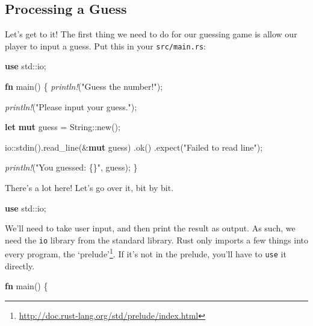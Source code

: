\documentclass[a4paper,]{book}
\newenvironment{Shaded}{\begin{snugshade}}{\end{snugshade}}
\newcommand{\KeywordTok}[1]{\textcolor[rgb]{0.13,0.29,0.53}{\textbf{{#1}}}}
\newcommand{\DataTypeTok}[1]{\textcolor[rgb]{0.13,0.29,0.53}{{#1}}}
\newcommand{\StringTok}[1]{\textcolor[rgb]{0.31,0.60,0.02}{{#1}}}
\newcommand{\PreprocessorTok}[1]{\textcolor[rgb]{0.56,0.35,0.01}{\textit{{#1}}}}
\newcommand{\NormalTok}[1]{{#1}}
\renewcommand{\href}[2]{#2\footnote{\url{#1}}}
\begin{document}
\subsection{Processing a Guess}\label{processing-a-guess}

Let's get to it! The first thing we need to do for our guessing game is
allow our player to input a guess. Put this in your
\texttt{src/main.rs}:

\begin{Shaded}
\begin{Highlighting}[]
\KeywordTok{use} \NormalTok{std::io;}

\KeywordTok{fn} \NormalTok{main() \{}
    \PreprocessorTok{println!}\NormalTok{(}\StringTok{"Guess the number!"}\NormalTok{);}

    \PreprocessorTok{println!}\NormalTok{(}\StringTok{"Please input your guess."}\NormalTok{);}

    \KeywordTok{let} \KeywordTok{mut} \NormalTok{guess = }\DataTypeTok{String}\NormalTok{::new();}

    \NormalTok{io::stdin().read_line(&}\KeywordTok{mut} \NormalTok{guess)}
        \NormalTok{.ok()}
        \NormalTok{.expect(}\StringTok{"Failed to read line"}\NormalTok{);}

    \PreprocessorTok{println!}\NormalTok{(}\StringTok{"You guessed: \{\}"}\NormalTok{, guess);}
\NormalTok{\}}
\end{Highlighting}
\end{Shaded}

There's a lot here! Let's go over it, bit by bit.

\begin{Shaded}
\begin{Highlighting}[]
\KeywordTok{use} \NormalTok{std::io;}
\end{Highlighting}
\end{Shaded}

We'll need to take user input, and then print the result as output. As
such, we need the \texttt{io} library from the standard library. Rust
only imports a few things into every program,
\href{http://doc.rust-lang.org/std/prelude/index.html}{the `prelude'}.
If it's not in the prelude, you'll have to \texttt{use} it directly.

\begin{Shaded}
\begin{Highlighting}[]
\KeywordTok{fn} \NormalTok{main() \{}
\end{Highlighting}
\end{Shaded}
\end{document}
